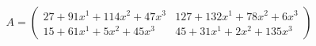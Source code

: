 \documentclass[preview]{standalone}
\begin{document}
\begin{align*}
A = \begin{pmatrix}27 + 91x^{1} + 114x^{2} + 47x^{3} & 127 + 132x^{1} + 78x^{2} + 6x^{3} \\ 15 + 61x^{1} + 5x^{2} + 45x^{3} & 45 + 31x^{1} + 2x^{2} + 135x^{3}\end{pmatrix}
\end{align*}
\end{document}
